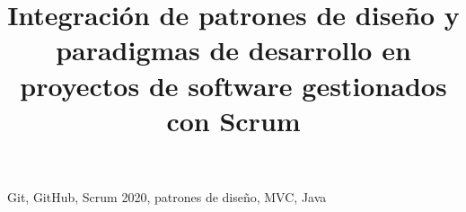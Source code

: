 \documentclass[conference]{IEEEtran}
\begin{document}
\title{Integración de patrones de diseño y paradigmas de desarrollo en proyectos de software gestionados con Scrum}

\author{
}

\maketitle

\begin{abstract}

\end{abstract}

\begin{IEEEkeywords}
Git, GitHub, Scrum 2020, patrones de diseño, MVC, Java
\end{IEEEkeywords}










\printbibliography
\end{document}
